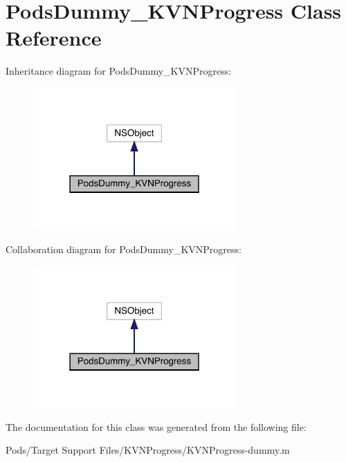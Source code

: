 \hypertarget{interface_pods_dummy___k_v_n_progress}{}\section{Pods\+Dummy\+\_\+\+K\+V\+N\+Progress Class Reference}
\label{interface_pods_dummy___k_v_n_progress}


Inheritance diagram for Pods\+Dummy\+\_\+\+K\+V\+N\+Progress\+:\nopagebreak
\begin{figure}[H]
\begin{center}
\leavevmode
\includegraphics[width=219pt]{interface_pods_dummy___k_v_n_progress__inherit__graph}
\end{center}
\end{figure}


Collaboration diagram for Pods\+Dummy\+\_\+\+K\+V\+N\+Progress\+:\nopagebreak
\begin{figure}[H]
\begin{center}
\leavevmode
\includegraphics[width=219pt]{interface_pods_dummy___k_v_n_progress__coll__graph}
\end{center}
\end{figure}


The documentation for this class was generated from the following file\+:\begin{DoxyCompactItemize}
\item 
Pods/\+Target Support Files/\+K\+V\+N\+Progress/K\+V\+N\+Progress-\/dummy.\+m\end{DoxyCompactItemize}

